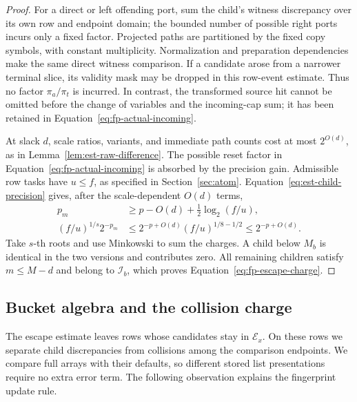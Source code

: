 \begin{proof}
For a direct or left offending port, sum the child's witness discrepancy
over its own row and endpoint domain; the bounded number of possible
right ports incurs only a fixed factor.  Projected paths are partitioned
by the fixed copy symbols, with constant multiplicity.  Normalization
and preparation dependencies make the same direct witness comparison.
If a candidate arose from a narrower terminal slice, its validity mask
may be dropped in this row-event estimate.  Thus no factor
$\pi_a/\pi_t$ is incurred.  In contrast, the transformed source hit
cannot be omitted before the change of variables and the incoming-cap
sum; it has been retained in Equation~\eqref{eq:fp-actual-incoming}.

At slack $d$, scale ratios, variants, and immediate path counts cost at
most $2^{O(d)}$, as in Lemma~\ref{lem:est-raw-difference}.  The possible
reset factor in Equation~\eqref{eq:fp-actual-incoming} is absorbed by the
precision gain.  Admissible row tasks have $u\le f$, as specified in
Section~\ref{sec:atom}.  Equation~\eqref{eq:est-child-precision} gives,
after the scale-dependent $O(d)$ terms,
\begin{align*}
 p_m&\ge p-O(d)+\tfrac12\log_2(f/u),\\
 (f/u)^{1/s}2^{-p_m}
 &\le 2^{-p+O(d)}(f/u)^{1/8-1/2}
 \le 2^{-p+O(d)}.
\end{align*}
Take $s$-th roots and use Minkowski to sum the charges.  A child below
$M_b$ is identical in the two versions and contributes zero.  All
remaining children satisfy $m\le M-d$ and belong to $\mathcal I_b$,
which proves Equation~\eqref{eq:fp-escape-charge}.
\end{proof}

\subsection{Bucket algebra and the collision charge}

The escape estimate leaves rows whose candidates stay in
$\mathcal E_x$.  On these rows we separate child discrepancies from
collisions among the comparison endpoints.  We compare full arrays with
their defaults, so different stored list presentations require no extra
error term.  The following observation explains the fingerprint update rule.

